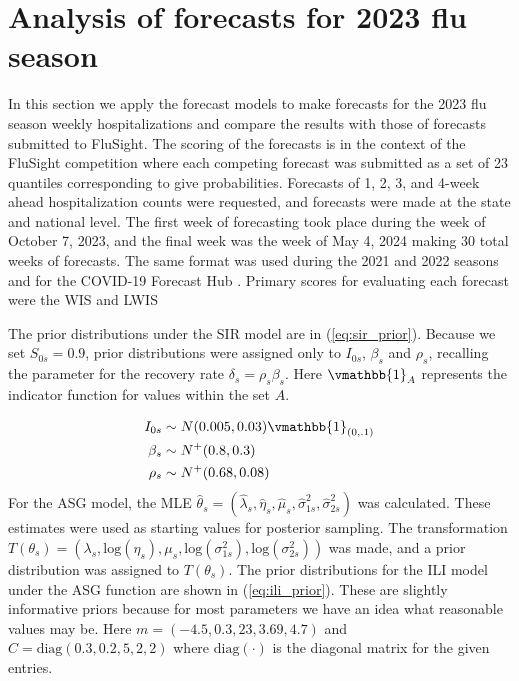 \section{Analysis of forecasts for 2023 flu season}
\label{sec:analysis}

In this section we apply the forecast models to make forecasts for the 2023 
flu season weekly hospitalizations and compare the results with those of 
forecasts submitted to FluSight. The scoring of the forecasts is in the 
context of the FluSight competition where each competing forecast was 
submitted as a set of 23 quantiles corresponding to give probabilities.
Forecasts of 1, 2, 3, and 4-week ahead hospitalization counts were requested, 
and forecasts were made at the state and national level. The first week of 
forecasting took place during the week of October 7, 2023, and the final week 
was the week of May 4, 2024 making 30 total weeks of forecasts.
 The same format was used during the 2021 and 2022 seasons and for the 
 COVID-19 Forecast Hub \cite[]{mathis2024evaluation, bracher2021evaluating}. 
 Primary scores for evaluating each forecast were the WIS and LWIS






The prior distributions under the SIR model are in (\ref{eq:sir_prior}). 
Because we set $S_{0s} = 0.9$, prior distributions were assigned only to 
$I_{0s}$, $\beta_s$ and $\rho_s$, recalling the parameter for the recovery 
rate $\delta_s = \rho_s \beta_s$. Here $\vmathbb{1}_{A}$ represents the 
indicator function for values within the set $A$.

\begin{equation}
\begin{aligned}
    \label{eq:sir_prior}
        I_{0s} &\sim N(0.005, 0.03) \vmathbb{1}_{(0, .1)} \\
        \beta_s &\sim N^+(0.8, 0.3) \\
        \rho_s &\sim N^+(0.68, 0.08)
\end{aligned}
\end{equation}
For the ASG model, the MLE 
$\hat{\theta}_s = (\hat{\lambda}_s, \hat{\eta}_s, \hat{\mu}_s, \hat{\sigma}_{1s}^2, \hat{\sigma}_{2s}^2)$ 
was calculated. %
These estimates were used as starting values for posterior sampling. 
The transformation 
$T(\theta_s) = (\lambda_s, \text{log}(\eta_s), \mu_s, \text{log}(\sigma_{1s}^2), \text{log}(\sigma_{2s}^2))$ 
was made, and a prior distribution was assigned to $T(\theta_s)$.
The prior distributions for the ILI model under the ASG function are shown 
in (\ref{eq:ili_prior}). These are slightly informative priors because for 
most parameters we have an idea what reasonable values may be. Here 
$m = (-4.5, 0.3, 23, 3.69, 4.7)$ and $C = \text{diag}(0.3, 0.2, 5, 2, 2)$
where $\text{diag}(\cdot)$ 
is the diagonal matrix for the given entries.


